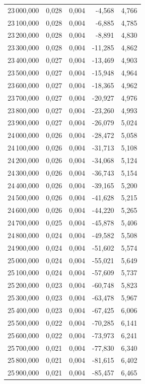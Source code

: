 \begin{longtable}{rrrrr}
23\,000,000 & 0,028 & 0,004 & -4,568 & 4,766\\
23\,100,000 & 0,028 & 0,004 & -6,885 & 4,785\\
23\,200,000 & 0,028 & 0,004 & -8,891 & 4,830\\
23\,300,000 & 0,028 & 0,004 & -11,285 & 4,862\\
23\,400,000 & 0,027 & 0,004 & -13,469 & 4,903\\
23\,500,000 & 0,027 & 0,004 & -15,948 & 4,964\\
23\,600,000 & 0,027 & 0,004 & -18,365 & 4,962\\
23\,700,000 & 0,027 & 0,004 & -20,927 & 4,976\\
23\,800,000 & 0,027 & 0,004 & -23,260 & 4,993\\
23\,900,000 & 0,027 & 0,004 & -26,079 & 5,024\\
24\,000,000 & 0,026 & 0,004 & -28,472 & 5,058\\
24\,100,000 & 0,026 & 0,004 & -31,713 & 5,108\\
24\,200,000 & 0,026 & 0,004 & -34,068 & 5,124\\
24\,300,000 & 0,026 & 0,004 & -36,743 & 5,154\\
24\,400,000 & 0,026 & 0,004 & -39,165 & 5,200\\
24\,500,000 & 0,026 & 0,004 & -41,628 & 5,215\\
24\,600,000 & 0,026 & 0,004 & -44,220 & 5,265\\
24\,700,000 & 0,025 & 0,004 & -45,878 & 5,406\\
24\,800,000 & 0,024 & 0,004 & -49,582 & 5,508\\
24\,900,000 & 0,024 & 0,004 & -51,602 & 5,574\\
25\,000,000 & 0,024 & 0,004 & -55,021 & 5,649\\
25\,100,000 & 0,024 & 0,004 & -57,609 & 5,737\\
25\,200,000 & 0,023 & 0,004 & -60,748 & 5,823\\
25\,300,000 & 0,023 & 0,004 & -63,478 & 5,967\\
25\,400,000 & 0,023 & 0,004 & -67,425 & 6,006\\
25\,500,000 & 0,022 & 0,004 & -70,285 & 6,141\\
25\,600,000 & 0,022 & 0,004 & -73,973 & 6,241\\
25\,700,000 & 0,021 & 0,004 & -77,830 & 6,340\\
25\,800,000 & 0,021 & 0,004 & -81,615 & 6,402\\
25\,900,000 & 0,021 & 0,004 & -85,457 & 6,465\\

\end{longtable}
